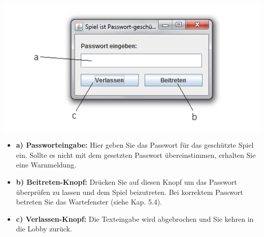 \documentclass[titlepage,10pt,a4paper]{article}
\begin{document}
\includegraphics[width=\textwidth]{Passwort-Fenster}
\begin{itemize}
		\item \textbf{a) Passworteingabe:} Hier geben Sie das Passwort für das geschützte Spiel ein. Sollte es nicht mit dem gesetzten Passwort übereinstimmen, erhalten Sie eine Warnmeldung.
		\item \textbf{b) Beitreten-Knopf:} Drücken Sie auf diesen Knopf um das Passwort überprüfen zu lassen und dem Spiel beizutreten. Bei korrektem Passwort betreten Sie das \gls{Wartefenster} (siehe Kap. 5.4).
		\item \textbf{c) Verlassen-Knopf:} Die Texteingabe wird abgebrochen und Sie kehren in die \gls{Lobby} zurück.
\end{itemize}
\end{document}
